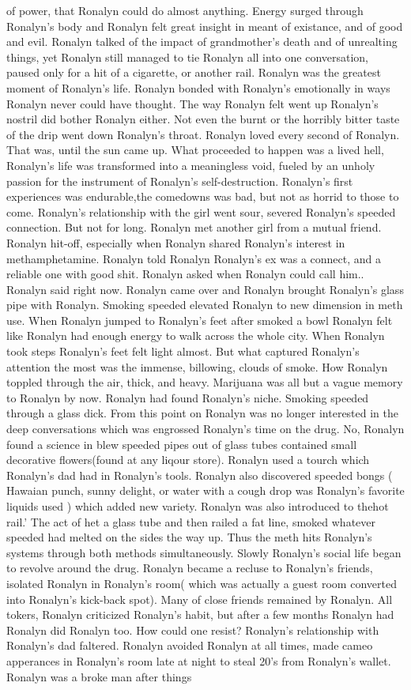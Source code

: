 \documentclass[12pt]{book}
\begin{document}
of power, that Ronalyn could do almost anything. Energy surged through Ronalyn's body and Ronalyn felt great insight in meant of existance, and of good and evil. Ronalyn talked of the impact of grandmother's death and of unrealting things, yet Ronalyn still managed to tie Ronalyn all into one conversation, paused only for a hit of a cigarette, or another rail. Ronalyn was the greatest moment of Ronalyn's life. Ronalyn bonded with Ronalyn's emotionally in ways Ronalyn never could have thought. The way Ronalyn felt went up Ronalyn's nostril did bother Ronalyn either. Not even the burnt or the horribly bitter taste of the drip went down Ronalyn's throat. Ronalyn loved every second of Ronalyn. That was, until the sun came up. What proceeded to happen was a lived hell, Ronalyn's life was transformed into a meaningless void, fueled by an unholy passion for the instrument of Ronalyn's self-destruction. Ronalyn's first experiences was endurable,the comedowns was bad, but not as horrid to those to come. Ronalyn's relationship with the girl went sour, severed Ronalyn's speeded connection. But not for long. Ronalyn met another girl from a mutual friend. Ronalyn hit-off, especially when Ronalyn shared Ronalyn's interest in methamphetamine. Ronalyn told Ronalyn Ronalyn's ex was a connect, and a reliable one with good shit. Ronalyn asked when Ronalyn could call him.. Ronalyn said right now. Ronalyn came over and Ronalyn brought Ronalyn's glass pipe with Ronalyn. Smoking speeded elevated Ronalyn to new dimension in meth use. When Ronalyn jumped to Ronalyn's feet after smoked a bowl Ronalyn felt like Ronalyn had enough energy to walk across the whole city. When Ronalyn took steps Ronalyn's feet felt light almost. But what captured Ronalyn's attention the most was the immense, billowing, clouds of smoke. How Ronalyn toppled through the air, thick, and heavy. Marijuana was all but a vague memory to Ronalyn by now. Ronalyn had found Ronalyn's niche. Smoking speeded through a glass dick. From this point on Ronalyn was no longer interested in the deep conversations which was engrossed Ronalyn's time on the drug. No, Ronalyn found a science in blew speeded pipes out of glass tubes contained small decorative flowers(found at any liqour store). Ronalyn used a tourch which Ronalyn's dad had in Ronalyn's tools. Ronalyn also discovered speeded bongs ( Hawaian punch, sunny delight, or water with a cough drop was Ronalyn's favorite liquids used ) which added new variety. Ronalyn was also introduced to thehot rail.' The act of het a glass tube and then railed a fat line, smoked whatever speeded had melted on the sides the way up. Thus the meth hits Ronalyn's systems through both methods simultaneously. Slowly Ronalyn's social life began to revolve around the drug. Ronalyn became a recluse to Ronalyn's friends, isolated Ronalyn in Ronalyn's room( which was actually a guest room converted into Ronalyn's kick-back spot). Many of close friends remained by Ronalyn. All tokers, Ronalyn criticized Ronalyn's habit, but after a few months Ronalyn had Ronalyn did Ronalyn too. How could one resist? Ronalyn's relationship with Ronalyn's dad faltered. Ronalyn avoided Ronalyn at all times, made cameo apperances in Ronalyn's room late at night to steal 20's from Ronalyn's wallet. Ronalyn was a broke man after things 
\end{document}
